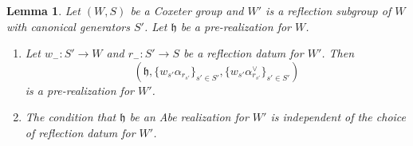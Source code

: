 \documentclass{amsart}
\newcommand{\fr}[1]{\mathfrak{#1}}
\newtheorem{lemma}[subsubsection]{Lemma}
\theoremstyle{definition}
\numberwithin{equation}{subsection}
\begin{document}
\begin{lemma}\label{lem:pre_realizations_and_reflection_subgroups}
    Let $(W,S)$ be a Coxeter group and $W'$ is a reflection subgroup of $W$ with canonical generators $S'$.
    Let $\fr{h}$ be a pre-realization for $W$.
    \begin{enumerate}
        \item Let $w_{-} : S' \to W$ and $r_{-} : S' \to S$ be a reflection datum for $W'$. Then 
        \[ (\fr{h}, \{w_{s'} \alpha_{r_{s'}}\}_{s' \in S'}, \{w_{s'} \alpha_{r_{s'}}^{\vee}\}_{s' \in S'} )\] 
        is a pre-realization for $W'$.
        \item The condition that $\fr{h}$ be an Abe realization for $W'$ is independent of the choice of reflection datum for $W'$.
    \end{enumerate}
\end{lemma}
\end{document}
